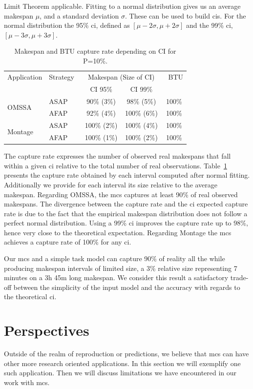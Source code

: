 \documentclass[]{llncs}
\begin{document}
Limit Theorem applicable.  Fitting to a normal distribution gives us an average
makespan $\mu{}$, and a standard deviation $\sigma{}$. These can be used to
build \acp{ci}. For the normal distribution  the 95\% \ac{ci}, defined  as
$[\mu{}-2\sigma{},\mu{}+2\sigma{}]$  and   the  99\%   \ac{ci},
$[\mu{}-3\sigma{},\mu{}+3\sigma{}]$.
%
\begin{table}[b]
	\centering
	\caption{Makespan and BTU capture rate depending on CI
          for P=10\%.}
       \label{tab:fit} 
	\begin{tabular}{llccc}
		\toprule
		Application&Strategy~&\multicolumn{2}{c}{~Makespan (Size of
		CI)~}&~BTU\\
                           &         & CI 95\% & CI 99\% &\\
		\midrule
		\multirow{2}{*}{OMSSA}&ASAP&  90\% (3\%)&  98\% (5\%)& 100\%\\
				      &AFAP&  92\% (4\%)& 100\% (6\%)& 100\%\\
		\midrule
		\multirow{2}{*}{Montage}&ASAP& 100\% (2\%)& 100\% (4\%)& 100\%\\
					&AFAP& 100\% (1\%)& 100\% (2\%)& 100\%\\
		\bottomrule
	\end{tabular}
\end{table}
%
The capture rate expresses the number of observed real makespans that fall
within a given \ac{ci} relative to the total number of real observations.
Table~\ref{tab:fit} presents the capture rate obtained by each interval computed
after normal fitting.  Additionally we provide for each interval its size
relative to the average makespan.
%
Regarding OMSSA, the \ac{mcs} captures at least 90\% of real observed
makespans. The divergence between the capture rate and the \ac{ci} expected
capture  rate is due  to the fact that the  empirical makespan distribution does
not follow a perfect normal distribution. Using  a 99\% \ac{ci} improves the
capture  rate up to  98\%, hence very close to the theoretical expectation.
Regarding Montage the \ac{mcs} achieves a capture rate of 100\% for any
\ac{ci}.


Our \ac{mcs} and a simple task model can capture 90\% of reality all the while
producing makespan intervals of limited size, a 3\% relative size representing 7
minutes on a 3h 45m long makespan. We consider this result a satisfactory
trade-off between the simplicity of the input model and the accuracy with
regards to the theoretical \ac{ci}.


\section{Perspectives}
\label{sec:disc}
Outside of the realm of reproduction or predictions, we believe that \ac{mcs}
can have other more research oriented applications. In this section we will
exemplify one such application. Then we will discuss limitations we have
encountered in our work with \ac{mcs}.
\end{document}

